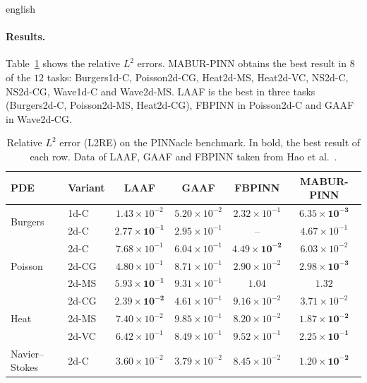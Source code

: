 \documentclass[../0000.tex]{subfiles}
\begin{document}
\begin{hyphenrules}{english}
\paragraph{Results.}
Table~\ref{tab:benchmark} shows the relative $L^2$ errors. MABUR-PINN obtains the best result in $8$ of the $12$
tasks: Burgers1d-C, Poisson2d-CG, Heat2d-MS, Heat2d-VC, NS2d-C, NS2d-CG, Wave1d-C and Wave2d-MS. LAAF is
the best in three tasks (Burgers2d-C, Poisson2d-MS, Heat2d-CG), FBPINN in Poisson2d-C and GAAF in
Wave2d-CG.

\begin{table}[htbp]
  \centering
  \caption[Relative $L^2$ error (L2RE) on the PINNacle benchmark]{Relative $L^2$ error (L2RE) on the PINNacle benchmark. In bold, the best result of each row.
  Data of LAAF, GAAF and FBPINN taken from Hao et al.~\cite[Table~3]{hao2024pinnacle}.}
  \label{tab:benchmark}
  \small
  \begin{tabular}{@{}llcccc@{}}
    \toprule
    PDE & Variant & LAAF & GAAF & FBPINN & MABUR-PINN \\
    \midrule
    \multirow{2}{*}{Burgers} & 1d-C & $1.43\times10^{-2}$ & $5.20\times10^{-2}$ & $2.32\times10^{-1}$ & $\mathbf{6.35\times10^{-3}}$ \\
                             & 2d-C & $\mathbf{2.77\times10^{-1}}$ & $2.95\times10^{-1}$ & -- & $4.67\times10^{-1}$ \\
    \midrule
    \multirow{3}{*}{Poisson} & 2d-C  & $7.68\times10^{-1}$ & $6.04\times10^{-1}$ & $\mathbf{4.49\times10^{-2}}$ & $6.03\times10^{-2}$ \\
                             & 2d-CG & $4.80\times10^{-1}$ & $8.71\times10^{-1}$ & $2.90\times10^{-2}$ & $\mathbf{2.98\times10^{-3}}$ \\
                             & 2d-MS & $\mathbf{5.93\times10^{-1}}$ & $9.31\times10^{-1}$ & $1.04$ & $1.32$ \\
    \midrule
    \multirow{3}{*}{Heat}    & 2d-CG & $\mathbf{2.39\times10^{-2}}$ & $4.61\times10^{-1}$ & $9.16\times10^{-2}$ & $3.71\times10^{-2}$ \\
                             & 2d-MS & $7.40\times10^{-2}$ & $9.85\times10^{-1}$ & $8.20\times10^{-2}$ & $\mathbf{1.87\times10^{-2}}$ \\
                             & 2d-VC & $6.42\times10^{-1}$ & $8.49\times10^{-1}$ & $9.52\times10^{-1}$ & $\mathbf{2.25\times10^{-1}}$ \\
    \midrule
    \multirow{2}{*}{Navier--Stokes} & 2d-C  & $3.60\times10^{-2}$ & $3.79\times10^{-2}$ & $8.45\times10^{-2}$ & $\mathbf{1.20\times10^{-2}}$ \\

\end{tabular}
\end{table}
\end{hyphenrules}
\end{document}
